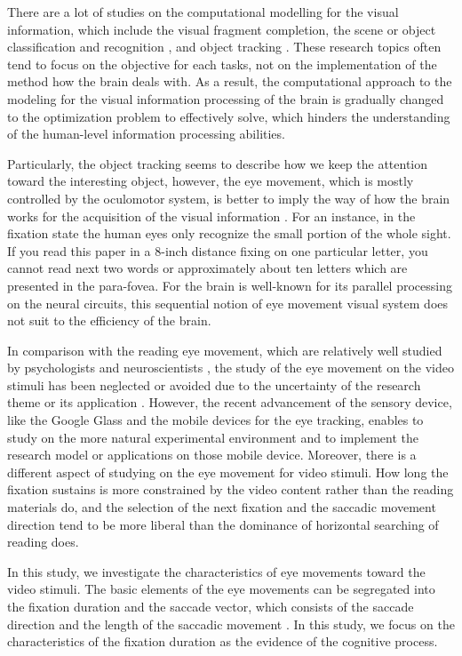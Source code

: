 \documentclass[10pt,letterpaper]{article}
\begin{document}
There are a lot of studies on the computational modelling for the visual information, which include the visual fragment completion, the scene or object classification and recognition \cite{winn2005,lazebnik2006}, and object tracking \cite{YiWu2013}. These research topics often tend to focus on the objective for each tasks, not on the implementation of the method how the brain deals with. As a result, the computational approach to the modeling for the visual information processing of the brain is gradually changed to the optimization problem to effectively solve, which hinders the understanding of the human-level information processing abilities. 

Particularly, the object tracking seems to describe how we keep the attention toward the interesting object, however, the eye movement, which is mostly controlled by the oculomotor system, is better to imply the way of how the brain works for the acquisition of the visual information \cite{Henderson2003}. For an instance, in the fixation state the human eyes only recognize the small portion of the whole sight. If you read this paper in a 8-inch distance fixing on one particular letter, you cannot read next two words or approximately about ten letters which are presented in the para-fovea. For the brain is well-known for its parallel processing on the neural circuits, this sequential notion of eye movement visual system does not suit to the efficiency of the brain.

In comparison with the reading eye movement, which are relatively well studied by psychologists and neuroscientists \cite{Rayner1998,Reichle1998}, the study of the eye movement on the video stimuli has been neglected or avoided due to the uncertainty of the research theme or its application \cite{Tatler2011}. However, the recent advancement of the sensory device, like the Google Glass and the mobile devices for the eye tracking, enables to study on the more natural experimental environment and to implement the research model or applications on those mobile device. Moreover, there is a different aspect of studying on the eye movement for video stimuli. How long the fixation sustains is more constrained by the video content rather than the reading materials do, and the selection of the next fixation and the saccadic movement direction tend to be more liberal than the dominance of horizontal searching of reading does. 

In this study, we investigate the characteristics of eye movements toward the video stimuli. The basic elements of the eye movements can be segregated into the fixation duration and the saccade vector, which consists of the saccade direction and the length of the saccadic movement \cite{Findlay1999,Feng2006}. In this study, we focus on the characteristics of the fixation duration as the evidence of the cognitive process.
\end{document}
